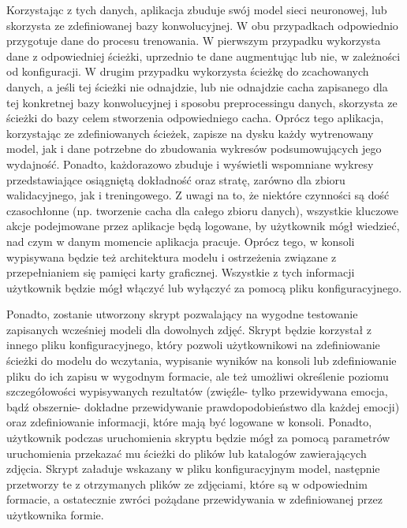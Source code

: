 Korzystając z tych danych, aplikacja zbuduje swój model sieci neuronowej, lub skorzysta ze zdefiniowanej bazy konwolucyjnej. W obu przypadkach odpowiednio przygotuje dane do procesu trenowania. W pierwszym przypadku wykorzysta dane z odpowiedniej ścieżki, uprzednio te dane augmentując lub nie, w zależności od konfiguracji. W drugim przypadku wykorzysta ścieżkę do zcachowanych danych, a jeśli tej ścieżki nie odnajdzie, lub nie odnajdzie cacha zapisanego dla tej konkretnej bazy konwolucyjnej i sposobu preprocessingu danych, skorzysta ze ścieżki do bazy celem stworzenia odpowiedniego cacha. Oprócz tego aplikacja, korzystając ze zdefiniowanych ścieżek, zapisze na dysku każdy wytrenowany model, jak i dane potrzebne do zbudowania wykresów podsumowujących jego wydajność. Ponadto, każdorazowo zbuduje i wyświetli wspomniane wykresy przedstawiające osiągniętą dokładność oraz stratę, zarówno dla zbioru walidacyjnego, jak i treningowego. Z uwagi na to, że niektóre czynności są dość czasochłonne (np. tworzenie cacha dla całego zbioru danych), wszystkie kluczowe akcje podejmowane przez aplikacje będą logowane, by użytkownik mógł wiedzieć, nad czym w danym momencie aplikacja pracuje. Oprócz tego, w konsoli wypisywana będzie też architektura modelu i ostrzeżenia związane z przepełnianiem się pamięci karty graficznej. Wszystkie z tych informacji użytkownik będzie mógł włączyć lub wyłączyć za pomocą pliku konfiguracyjnego.

Ponadto, zostanie utworzony skrypt pozwalający na wygodne testowanie zapisanych wcześniej modeli dla dowolnych zdjęć. Skrypt będzie korzystał z innego pliku konfiguracyjnego, który pozwoli użytkownikowi na zdefiniowanie ścieżki do modelu do wczytania, wypisanie wyników na konsoli lub zdefiniowanie pliku do ich zapisu w wygodnym formacie, ale też umożliwi określenie poziomu szczegółowości wypisywanych rezultatów (zwięźle- tylko przewidywana emocja, bądź obszernie- dokładne przewidywanie prawdopodobieństwo dla każdej emocji) oraz zdefiniowanie informacji, które mają być logowane w konsoli. Ponadto, użytkownik podczas uruchomienia skryptu będzie mógł za pomocą parametrów uruchomienia przekazać mu ścieżki do plików lub katalogów zawierających zdjęcia. Skrypt załaduje wskazany w pliku konfiguracyjnym model, następnie przetworzy te z otrzymanych plików ze zdjęciami, które są w odpowiednim formacie, a ostatecznie zwróci pożądane przewidywania w zdefiniowanej przez użytkownika formie. 
